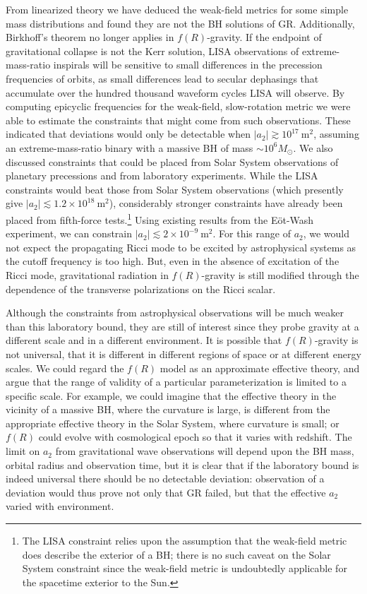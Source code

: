 \documentclass[aps,prd,amsfonts,amssymb,amsmath,nofootinbib,reprint,showpacs]{revtex4-1}
\newcommand{\units}[1]{\ensuremath{~\mathrm{#1}}}
\begin{document}
From linearized theory we have deduced the weak-field metrics for some simple mass distributions and found they are not the BH solutions of GR. Additionally, Birkhoff's theorem no longer applies in $f(R)$-gravity. If the endpoint of gravitational collapse is not the Kerr solution, LISA observations of extreme-mass-ratio inspirals will be sensitive to small differences in the precession frequencies of orbits, as small differences lead to secular dephasings that accumulate over the hundred thousand waveform cycles LISA will observe. By computing epicyclic frequencies for the weak-field, slow-rotation metric we were able to estimate the constraints that might come from such observations. These indicated that deviations would only be detectable when $|a_2| \gtrsim 10^{17}\units{m^2}$, assuming an extreme-mass-ratio binary with a massive BH of mass $\sim 10^6 M_\odot$. We also discussed constraints that could be placed from Solar System observations of planetary precessions and from laboratory experiments. While the LISA constraints would beat those from Solar System observations (which presently give $|a_2| \lesssim 1.2 \times 10^{18}\units{m^2}$), considerably stronger constraints have already been placed from fifth-force tests.\footnote{The LISA constraint relies upon the assumption that the weak-field metric does describe the exterior of a BH; there is no such caveat on the Solar System constraint since the weak-field metric is undoubtedly applicable for the spacetime exterior to the Sun.} Using existing results from the E\"ot-Wash experiment, we can constrain $|a_2| \lesssim 2 \times 10^{-9}\units{m^2}$. For this range of $a_2$, we would not expect the propagating Ricci mode to be excited by astrophysical systems as the cutoff frequency is too high. But, even in the absence of excitation of the Ricci mode, gravitational radiation in $f(R)$-gravity is still modified through the dependence of the transverse polarizations on the Ricci scalar. 

Although the constraints from astrophysical observations will be much weaker than this laboratory bound, they are still of interest since they probe gravity at a different scale and in a different environment. It is possible that $f(R)$-gravity is not universal, that it is different in different regions of space or at different energy scales. We could regard the $f(R)$ model as an approximate effective theory, and argue that the range of validity of a particular parameterization is limited to a specific scale. For example, we could imagine that the effective theory in the vicinity of a massive BH, where the curvature is large, is different from the appropriate effective theory in the Solar System, where curvature is small; or $f(R)$ could evolve with cosmological epoch so that it varies with redshift. The limit on $a_2$ from gravitational wave observations will depend upon the BH mass, orbital radius and observation time, but it is clear that if the laboratory bound is indeed universal there should be no detectable deviation: observation of a deviation would thus prove not only that GR failed, but that the effective $a_2$ varied with environment.
\end{document}
